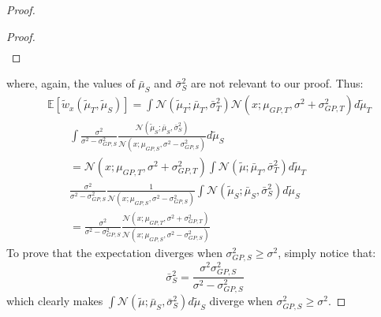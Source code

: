 \begin{proof}
\begin{proof}
\begin{equation*}
\begin{aligned}
          \end{aligned}
        \end{equation*}
      \end{proof}
      \noindent where, again, the values of $\bar{\mu}_{S}$ and $\bar{\sigma}^{2}_{S}$ are not relevant to our proof. Thus:
      \begin{equation}
        \begin{aligned}
          & \mathbb{E}[\tilde{w}_{x}(\tilde{\mu}_{T}, \tilde{\mu}_{S})] = \int \mathcal{N}(\tilde{\mu}_{T}; \bar{\mu}_{T}, \bar{\sigma}^{2}_{T}) \mathcal{N}(x; \mu_{GP,T}, \sigma^{2} + \sigma^{2}_{GP,T}) d\tilde{\mu}_{T} \\
          & \qquad \int \frac{\sigma^{2}}{\sigma^{2}-\sigma^{2}_{GP,S}} \frac{\mathcal{N}(\tilde{\mu}_{S}; \bar{\mu}_{S}, \bar{\sigma}^{2}_{S})}{\mathcal{N}(x; \mu_{GP,S}, \sigma^{2}-\sigma^{2}_{GP,S})} d\tilde{\mu}_{S} \\
          & \qquad = \mathcal{N}(x; \mu_{GP,T}, \sigma^{2}+\sigma^{2}_{GP,T}) \int \mathcal{N}(\tilde{\mu}; \bar{\mu}_{T}, \bar{\sigma}^{2}_{T}) d\tilde{\mu}_{T} \\
          & \qquad \frac{\sigma^{2}}{\sigma^{2} - \sigma^{2}_{GP,S}} \frac{1}{\mathcal{N}(x; \mu_{GP,S}, \sigma^{2}-\sigma^{2}_{GP,S})} \int \mathcal{N}(\tilde{\mu}_{S}; \bar{\mu}_{S}, \bar{\sigma}^{2}_{S}) d\tilde{\mu}_{S} \\
          & \qquad = \frac{\sigma^{2}}{\sigma^{2}-\sigma^{2}_{GP,S}} \frac{\mathcal{N}(x; \mu_{GP,T}, \sigma^{2} + \sigma^{2}_{GP,T})}{\mathcal{N}(x; \mu_{GP,S}, \sigma^{2}-\sigma^{2}_{GP,S})}
        \end{aligned}
      \end{equation}
      To prove that the expectation diverges when $\sigma^{2}_{GP,S} \geq \sigma^{2}$, simply notice that:
      \begin{equation}
        \bar{\sigma}^{2}_{S} = \frac{\sigma^{2}\sigma^{2}_{GP,S}}{\sigma^{2}-\sigma^{2}_{GP,S}}
      \end{equation}
      which clearly makes $\int \mathcal{N}(\tilde{\mu}; \bar{\mu}_{S}, \bar{\sigma}^{2}_{S}) d\tilde{\mu}_{S}$ diverge when $\sigma^{2}_{GP,S} \geq \sigma^{2}$.
    \end{proof}


